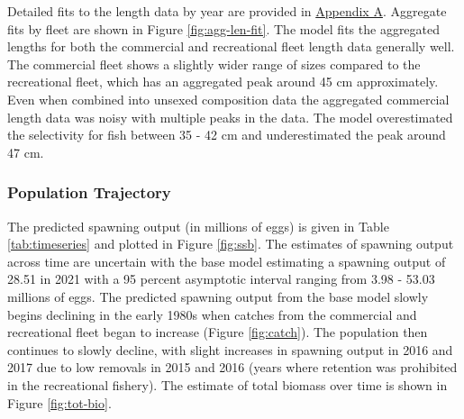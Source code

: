 \documentclass[11pt,
  english,
  a4paper,
]{article}
\begin{document}
\leavevmode\tagmcend\tagstructend\par


Detailed fits to the length data by year are provided in {\protect\hyperlink{append_a}{Appendix A}\leavevmode\tagmcend\tagstructend}. Aggregate fits by fleet are shown in Figure \ref{fig:agg-len-fit}. The model fits the aggregated lengths for both the commercial and recreational fleet length data generally well. The commercial fleet shows a slightly wider range of sizes compared to the recreational fleet, which has an aggregated peak around 45 cm approximately. Even when combined into unsexed composition data the aggregated commercial length data was noisy with multiple peaks in the data. The model overestimated the selectivity for fish between 35 - 42 cm and underestimated the peak around 47 cm.

\leavevmode\tagmcend\tagstructend\par


\hypertarget{population-trajectory}{%
\subsubsection{Population Trajectory}\label{population-trajectory}}

\leavevmode\tagmcend\tagstructend


The predicted spawning output (in millions of eggs) is given in Table \ref{tab:timeseries} and plotted in Figure \ref{fig:ssb}. The estimates of spawning output across time are uncertain with the base model estimating a spawning output of 28.51 in 2021 with a 95 percent asymptotic interval ranging from 3.98 - 53.03 millions of eggs. The predicted spawning output from the base model slowly begins declining in the early 1980s when catches from the commercial and recreational fleet began to increase (Figure \ref{fig:catch}). The population then continues to slowly decline, with slight increases in spawning output in 2016 and 2017 due to low removals in 2015 and 2016 (years where retention was prohibited in the recreational fishery). The estimate of total biomass over time is shown in Figure \ref{fig:tot-bio}.

\leavevmode\tagmcend\tagstructend\par
\end{document}
